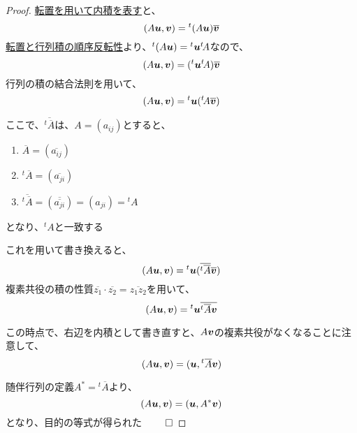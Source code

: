 \documentclass[../../../topic_linear-algebra]{subfiles}
\begin{document}
\begin{proof}
  \hyperref[thm:inner-product-as-transpose-product]{転置を用いて内積を表す}と、
  \begin{equation*}
    (A\vb*{u},\vb*{v}) = {}^t(A\vb*{u}) \overline{\vb*{v}}
  \end{equation*}
  \hyperref[thm:transpose-of-product]{転置と行列積の順序反転性}より、${}^t(A\vb*{u}) = {}^t\vb*{u} {}^t\! A$なので、
  \begin{equation*}
    (A\vb*{u},\vb*{v}) = ({}^t\vb*{u} {}^t\! A) \overline{\vb*{v}}
  \end{equation*}
  行列の積の結合法則を用いて、
  \begin{equation*}
    (A\vb*{u},\vb*{v}) = {}^t\vb*{u} ({}^t\! A\overline{\vb*{v}})
  \end{equation*}

  ここで、$\overline{{}^t \overline{A}}$は、$A=(a_{ij})$とすると、
  \begin{enumerate}
    \item $\overline{A} = (\overline{a_{ij}})$
    \item ${}^t\overline{A} = (\overline{a_{ji}})$
    \item $\overline{{}^t\overline{A}} = (\overline{\overline{a_{ji}}}) = (a_{ji}) = {}^t A$
  \end{enumerate}
  となり、${}^t A$と一致する

  これを用いて書き換えると、
  \begin{equation*}
    (A\vb*{u},\vb*{v}) = {}^t\vb*{u} (\overline{{}^t \overline{A}} \overline{\vb*{v}})
  \end{equation*}
  複素共役の積の性質$\overline{z_1} \cdot \overline{z_2} = \overline{z_1 z_2}$を用いて、
  \begin{equation*}
    (A\vb*{u},\vb*{v}) = {}^t\vb*{u} \overline{{}^t \overline{A} \vb*{v}}
  \end{equation*}

  この時点で、右辺を内積として書き直すと、$A\vb*{v}$の複素共役がなくなることに注意して、
  \begin{equation*}
    (A\vb*{u},\vb*{v}) = (\vb*{u}, {}^t \overline{A} \vb*{v})
  \end{equation*}

  随伴行列の定義$A^* = {}^t \overline{A}$より、
  \begin{equation*}
    (A\vb*{u},\vb*{v}) = (\vb*{u}, A^* \vb*{v})
  \end{equation*}
  となり、目的の等式が得られた $\qed$
\end{proof}
\end{document}
